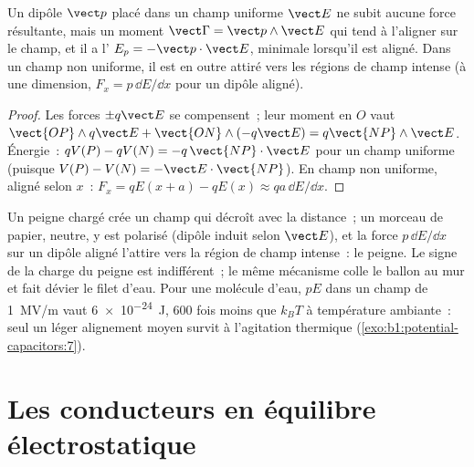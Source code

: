 \begin{proposition}\label{prop:b1:potential-capacitors:dipoleinfield}
Un dipôle $\vect p$ placé dans un champ uniforme $\vect E$ ne subit aucune
force résultante, mais un moment $\vect\Gamma = \vect p\wedge\vect E$ qui tend
à l'aligner sur le champ, et il a l' $E_p = -\vect p\cdot\vect E$,
minimale lorsqu'il est aligné. Dans un champ non uniforme, il est en outre
attiré vers les régions de champ intense (à une dimension, $F_x = p\,\dd E/\dd x$
pour un dipôle aligné).
\end{proposition}

\begin{proof}
Les forces $\pm q\vect E$ se compensent~; leur moment en $O$ vaut $\vect{OP}\wedge
q\vect E + \vect{ON}\wedge(-q\vect E) = q\vect{NP}\wedge\vect E$. Énergie~:
$qV(P) - qV(N) = -q\,\vect{NP}\cdot\vect E$ pour un champ uniforme (puisque $V(P)
- V(N) = -\vect E\cdot\vect{NP}$). En champ non uniforme, aligné selon $x$~: $F_x =
qE(x + a) - qE(x) \approx qa\,\dd E/\dd x$.
\end{proof}

\begin{example}\label{ex:b1:potential-capacitors:comb}
Un peigne chargé crée un champ qui décroît avec la distance~; un morceau de
papier, neutre, y est polarisé (dipôle induit selon $\vect E$), et la force
$p\,\dd E/\dd x$ sur un dipôle aligné l'attire vers la région de champ
intense~: le peigne. Le signe de la charge du peigne est indifférent~; le même
mécanisme colle le ballon au mur et fait dévier le filet d'eau. Pour une
molécule d'eau, $pE$ dans un champ de \qty{1}{MV/m} vaut \qty{6e-24}{J},
$600$ fois moins que $k_BT$ à température ambiante~: seul un léger alignement
moyen survit à l'agitation thermique
(\cref{exo:b1:potential-capacitors:7}).
\end{example}

\section{Les conducteurs en équilibre électrostatique}

